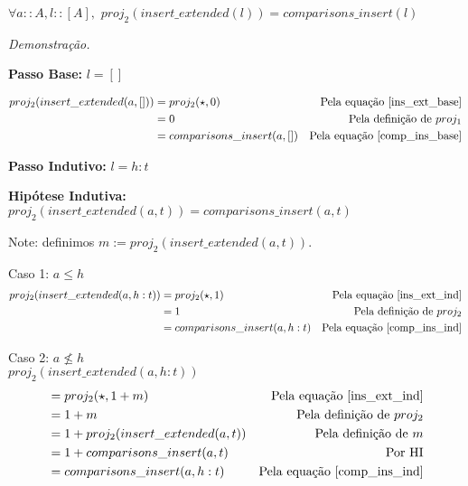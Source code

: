\documentclass[12pt, oneside, a4paper,english,brazil]{abntex2}
\begin{document}
\begin{teorema}
  $\forall a :: A, l :: [A], \,\, proj_{2}(insert\_extended(l)) = comparisons\_insert(l)$
\end{teorema}

\noindent \textit{Demonstra\c{c}\~ao.}

\textbf{Passo Base: } $l = []$

\begin{align*}
  proj_{2}(insert\_extended(a, [])) &= proj_{2}(\star, 0) &\text{Pela equa\c{c}\~ao \ref{ins_ext_base}}\\
                                 &= 0 &\text{Pela defini\c{c}\~ao de } proj_{1} \\
  &= comparisons\_insert(a, []) &\text{Pela equa\c{c}\~ao \ref{comp_ins_base}}
\end{align*}

\textbf{Passo Indutivo: } $l = h : t$

\textbf{Hip\'otese Indutiva: } $proj_{2}(insert\_extended(a, t)) = comparisons\_insert(a, t)$

Note: definimos $m := proj_{2}(insert\_extended(a, t))$.

Caso 1: $a \le h$
\begin{align*}
  proj_{2}(insert\_extended(a, h : t)) &= proj_{2}(\star, 1) &\text{Pela equa\c{c}\~ao \ref{ins_ext_ind}}\\
                                       &= 1 &\text{Pela defini\c{c}\~ao de } proj_{2} \\
  &= comparisons\_insert(a, h : t) &\text{Pela equa\c{c}\~ao \ref{comp_ins_ind}}
\end{align*}

Caso 2: $a \not\le h$ \\

$proj_{2}(insert\_extended(a, h : t))$
\begin{align*}
  &= proj_{2}(\star, 1 + m) &\text{Pela equa\c{c}\~ao \ref{ins_ext_ind}} \\
                                    &= 1 + m &\text{Pela defini\c{c}\~ao de } proj_{2} \\
                                    &= 1 + proj_{2}(insert\_extended(a, t)) &\text{Pela defini\c{c}\~ao de } m\\
                                    &= 1 + comparisons\_insert(a, t) &\text{Por HI} \\
  &= comparisons\_insert(a, h : t) &\text{Pela equa\c{c}\~ao \ref{comp_ins_ind}}
\end{align*}
\end{document}

